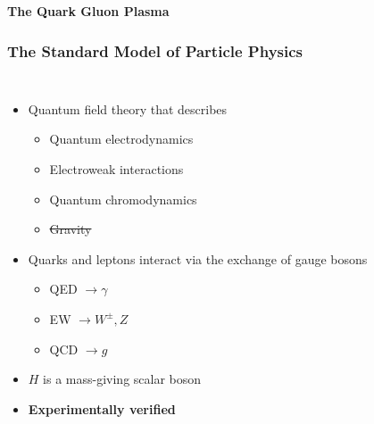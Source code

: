 \documentclass[9pt]{beamer}
\begin{document}
     \begin{frame}
       \centering \textbf{The Quark Gluon Plasma}
     \end{frame}

     \begin{frame}
       \frametitle{\textbf{The Standard Model of Particle Physics}}
       \begin{columns}
         \begin{itemize}
         \item Quantum field theory that describes
           \begin{itemize}
           \item Quantum electrodynamics
           \item Electroweak interactions
           \item Quantum chromodynamics
           \item \st{Gravity}
           \end{itemize}
         \item Quarks and leptons interact via the exchange of gauge bosons
           \begin{itemize}
           \item QED $\to \gamma$
           \item EW $\to W^{\pm}, Z$
           \item QCD $\to g$
           \end{itemize}
         \item $H$ is a mass-giving scalar boson
         \item \textbf{Experimentally verified}
         \end{itemize}
       \end{columns}
     \end{frame}
\end{document}
